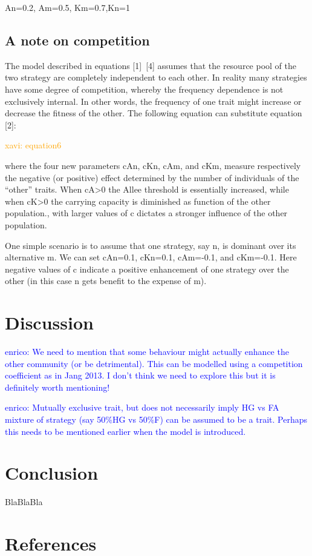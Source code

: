 \documentclass[preprint,authoryear]{elsarticle}
\newcommand{\memo}[2]{\textcolor{#1}{#2}}
\newcommand{\xavi}[1]{\memo{orange}{xavi: #1\\}}
\newcommand{\enrico}[1]{\memo{blue}{enrico: #1\\}}
\begin{document}
An=0.2, Am=0.5, Km=0.7,Kn=1

\subsection{A note on competition}

The model described in equations [1]~[4] assumes that the resource pool of the two strategy are completely independent to each other. In reality many strategies have some degree of competition, whereby the frequency dependence is not exclusively internal. In other words, the frequency of one  trait might increase or decrease the fitness of the other. The following equation can substitute equation [2]: 

\xavi{equation6}

where the four new parameters cAn, cKn, cAm, and cKm, measure respectively the negative (or positive) effect determined by the number of individuals of the “other” traits. When cA>0 the Allee threshold is essentially increased, while when cK>0 the carrying capacity is diminished as function of the other population., with larger values of c dictates a stronger influence of the other population. 

One simple scenario is to assume that one strategy, say n, is dominant over its alternative m. We can  set cAn=0.1,  cKn=0.1,  cAm=-0.1, and  cKm=-0.1. Here negative values of c indicate a positive enhancement of one strategy over the other (in this case n gets benefit to the expense of m). 

\section{Discussion}

\enrico{We need to mention that some behaviour might actually enhance the other community (or be detrimental). This can be modelled using a competition coefficient as in Jang 2013. I don't think we need to explore this but it is definitely worth mentioning!}

\enrico{Mutually exclusive trait, but does not necessarily imply HG vs FA mixture of strategy (say 50\%HG vs 50\%F) can be assumed to be a trait. Perhaps this needs to be mentioned earlier when the model is introduced.}

\section{Conclusion}

BlaBlaBla

\section{References}



\end{document}
